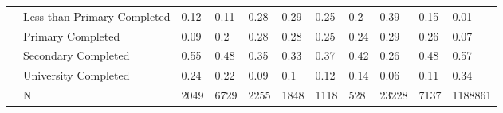 \begin{table}[ht]
\begin{tabular}{l|l|lllllllll}
   & Less than Primary Completed & 0.12 & 0.11 & 0.28 & 0.29 & 0.25 & 0.2 & 0.39 & 0.15 & 0.01 \\ 
   & Primary Completed & 0.09 & 0.2 & 0.28 & 0.28 & 0.25 & 0.24 & 0.29 & 0.26 & 0.07 \\ 
   & Secondary Completed & 0.55 & 0.48 & 0.35 & 0.33 & 0.37 & 0.42 & 0.26 & 0.48 & 0.57 \\ 
   & University Completed & 0.24 & 0.22 & 0.09 & 0.1 & 0.12 & 0.14 & 0.06 & 0.11 & 0.34 \\ 
   & N & 2049 & 6729 & 2255 & 1848 & 1118 & 528 & 23228 & 7137 & 1188861 \\ 
   \hline
\end{tabular}
\endgroup
\end{table}
